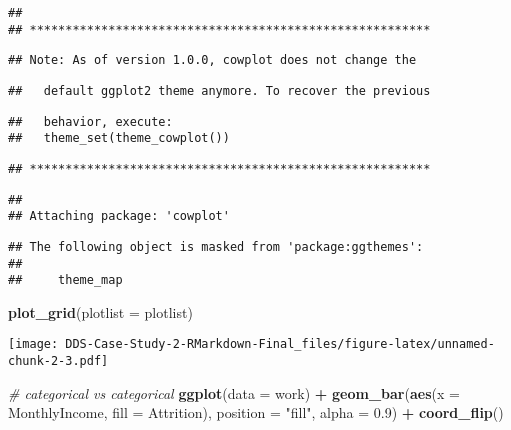 \documentclass[]{article}
\newenvironment{Shaded}{\begin{snugshade}}{\end{snugshade}}
\newcommand{\CommentTok}[1]{\textcolor[rgb]{0.56,0.35,0.01}{\textit{#1}}}
\newcommand{\DataTypeTok}[1]{\textcolor[rgb]{0.13,0.29,0.53}{#1}}
\newcommand{\FloatTok}[1]{\textcolor[rgb]{0.00,0.00,0.81}{#1}}
\newcommand{\KeywordTok}[1]{\textcolor[rgb]{0.13,0.29,0.53}{\textbf{#1}}}
\newcommand{\NormalTok}[1]{#1}
\newcommand{\OperatorTok}[1]{\textcolor[rgb]{0.81,0.36,0.00}{\textbf{#1}}}
\newcommand{\StringTok}[1]{\textcolor[rgb]{0.31,0.60,0.02}{#1}}
\begin{document}
\begin{verbatim}
## 
## ********************************************************
\end{verbatim}

\begin{verbatim}
## Note: As of version 1.0.0, cowplot does not change the
\end{verbatim}

\begin{verbatim}
##   default ggplot2 theme anymore. To recover the previous
\end{verbatim}

\begin{verbatim}
##   behavior, execute:
##   theme_set(theme_cowplot())
\end{verbatim}

\begin{verbatim}
## ********************************************************
\end{verbatim}

\begin{verbatim}
## 
## Attaching package: 'cowplot'
\end{verbatim}

\begin{verbatim}
## The following object is masked from 'package:ggthemes':
## 
##     theme_map
\end{verbatim}

\begin{Shaded}
\begin{Highlighting}[]
\KeywordTok{plot_grid}\NormalTok{(}\DataTypeTok{plotlist =}\NormalTok{ plotlist)}
\end{Highlighting}
\end{Shaded}

\texttt{[image: DDS-Case-Study-2-RMarkdown-Final\_files/figure-latex/unnamed-chunk-2-3.pdf]}

\begin{Shaded}
\begin{Highlighting}[]
\CommentTok{# categorical vs categorical}
\KeywordTok{ggplot}\NormalTok{(}\DataTypeTok{data =}\NormalTok{ work) }\OperatorTok{+}\StringTok{ }\KeywordTok{geom_bar}\NormalTok{(}\KeywordTok{aes}\NormalTok{(}\DataTypeTok{x =}\NormalTok{ MonthlyIncome, }\DataTypeTok{fill =}\NormalTok{ Attrition), }\DataTypeTok{position =} \StringTok{"fill"}\NormalTok{, }\DataTypeTok{alpha =} \FloatTok{0.9}\NormalTok{) }\OperatorTok{+}\StringTok{ }\KeywordTok{coord_flip}\NormalTok{()}
\end{Highlighting}
\end{Shaded}
\end{document}
